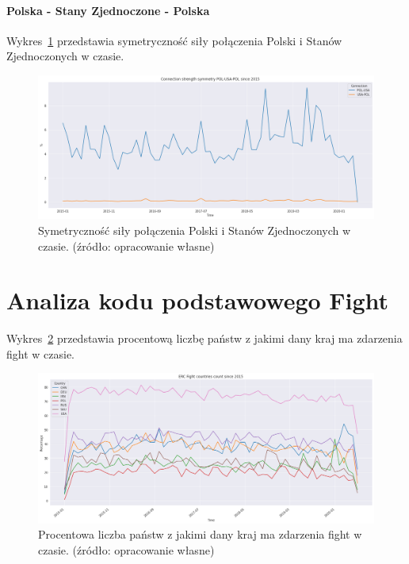\documentclass[11pt]{report}
\begin{document}
    \paragraph{Polska - Stany Zjednoczone - Polska}

    Wykres~\ref{fig:POL-USA-POL} przedstawia symetryczność siły połączenia Polski i Stanów Zjednoczonych w czasie.


    \begin{figure}[!htp]
        \centering
        \includegraphics[width=\linewidth]{fig/ConnectionSymmetry/POL-USA-POL.png}
        \caption{Symetryczność siły połączenia Polski i Stanów Zjednoczonych w czasie. (źródło: opracowanie własne)}
        \label{fig:POL-USA-POL}
    \end{figure}


    \section{Analiza kodu podstawowego Fight}

    Wykres~\ref{fig:Fight} przedstawia procentową liczbę państw z jakimi dany kraj ma zdarzenia fight w czasie.

    \begin{figure}[!htp]
        \centering
        \includegraphics[width=\linewidth]{fig/ERC/Fight.png}
        \caption{Procentowa liczba państw z jakimi dany kraj ma zdarzenia fight w czasie. (źródło: opracowanie własne)}
        \label{fig:Fight}
    \end{figure}
\end{document}
